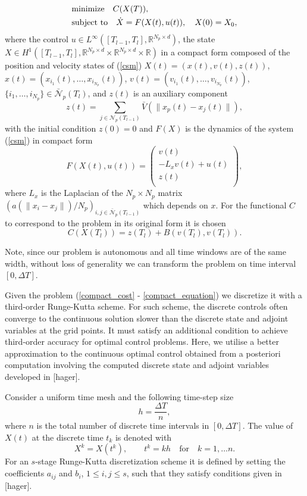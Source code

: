 \documentclass[a4paper,10pt, english]{article}
\newcommand{\D}{\displaystyle}
\begin{document}
 \begin{align}
 \D
 & \mbox{minimize}\quad  C(X(T)),   \label{compact_cost} \\ 
 & \mbox{subject to} \quad \dot{X} = F(X(t), u(t)), \quad X(0) = X_0, \label{compact_equation}
 \end{align}
where  the control $u \in  L^{\infty}([T_{l-1}, T_{l}], \mathbb{R}^{N_p \times d})$,
the state $X\in H^1([T_{l-1}, T_{l}], \mathbb{R}^{N_p \times d} \times \mathbb{R}^{N_p\times d} \times \mathbb{R})$
in a compact form composed of the position and velocity 
states of (\ref{csm})   $X(t) = (x(t), v(t), z(t))$, $x(t) = (x_{i_1}(t), \dots, x_{i_{N_p}}(t))$,
 $v(t) = (v_{i_1}(t), \dots, v_{i_{N_p}}(t))$, $\{i_1, \dots, i_{N_p}\} \in \bar{\mathcal{N}}_p(T_l)$, 
 and $z(t)$ is an auxiliary component 
 $$
 z(t) =  \sum_{j\in \mathcal{N}_p(T_{l-1})} \bar{V}(\|x_p(t) - x_j(t)\|),
 $$
 with the initial condition $z(0) = 0$ and $F(X)$ is the dynamics of the system (\ref{csm}) in compact form
 $$
 F(X(t), u(t)) =
  \left( 
  \begin{array}{c}
  v(t)\\
   - L_xv(t) + u(t)\\
   z(t)\\
 \end{array} 
 \right), 
 $$
 where $L_x$ is the Laplacian of the $N_p\times N_p$ matrix $(a(\|x_i - x_j\|)/N_p)_{i, j\in\bar{\mathcal{N}}_p(T_{l-1})}$ which depends on $x$.
 For the functional $C$ to correspond to the problem in its original form it is chosen 
 $$
 C(X(T_l)) = z(T_l) + B(v(T_l), v(T_l)).
 $$
 
  Note, since our problem is autonomous and all time windows are of the same width, without loss of generality
 we can transform the problem on time interval $[0, \Delta T]$. 
 
 
  
  Given the problem (\ref{compact_cost} - \ref{compact_equation}) we discretize it with a third-order Runge-Kutta scheme.  For such scheme, the discrete controls often converge to the continuous solution slower than the discrete state and adjoint variables at the grid points. It  must satisfy an additional condition to achieve third-order accuracy
    for optimal control problems. Here, we utilise a better approximation to the continuous optimal control obtained from a posteriori computation involving the computed discrete state and adjoint variables  developed in [hager]. 
    
  Consider a uniform time mesh and the following time-step size
 \begin{equation}
   h = \frac{\Delta T}{n},
   \label{h}
 \end{equation}
 where $n$ is the total number of discrete time intervals in $[0, \Delta T]$.  The value of $X(t)$ at the discrete time $t_k$ is denoted with
 $$
 X^k = X(t^k), \qquad t^k = kh \quad\mbox{for} \quad k = 1, \dots n.
 $$
 For an $s$-stage Runge-Kutta discretization scheme it is defined by setting the coefficients $a_{ij}$ and
 $b_{i}$, $1\leq i, j\leq s$, such that they satisfy conditions given in [hager]. 
 
\end{document}
